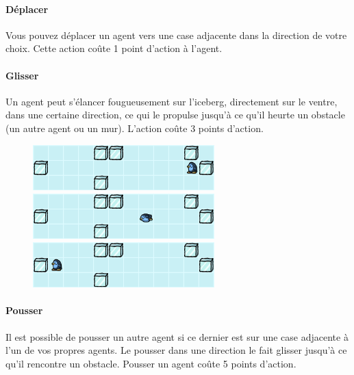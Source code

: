 \paragraph{Déplacer}\label{duxe9placer}

Vous pouvez déplacer un agent vers une case adjacente dans la direction
de votre choix. Cette action coûte 1 point d'action à l'agent.

\paragraph{Glisser}\label{glisser}

Un agent peut s'élancer fougueusement sur l'iceberg, directement sur le
ventre, dans une certaine direction, ce qui le propulse jusqu'à ce qu'il
heurte un obstacle (un autre agent ou un mur). L'action coûte 3 points
d'action.

\begin{figure}[!h]
    \centering
    \includegraphics[width=7cm]{img/slide1}

    \vspace{0.5cm}
    \includegraphics[width=7cm]{img/slide2}

    \vspace{0.5cm}
    \includegraphics[width=7cm]{img/slide3}
\end{figure}

\newpage
\paragraph{Pousser}\label{pousser}

Il est possible de pousser un autre agent si ce dernier est sur une case
adjacente à l'un de vos propres agents. Le pousser dans une direction le
fait glisser jusqu'à ce qu'il rencontre un obstacle. Pousser un agent
coûte 5 points d'action.

